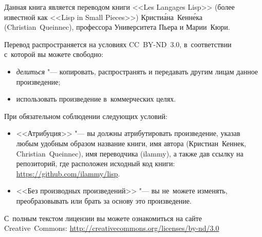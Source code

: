\begingroup
\thispagestyle{empty}
\setlength{\parindent}{0pt}
\small

Данная книга является переводом книги <<Les Langages Lisp>> (более известной
как <<Lisp in Small Pieces>>) Кристи\'{а}на~Кенн\'{е}ка (Christian~Queinnec),
профессора Университета Пьера и Марии~Кюри.

\bigskip

Перевод распространяется на условиях \textsf{CC~BY-ND~3.0}, в~соответствии
с~которой вы можете свободно:

\begin{itemize}
  \item \emph{делиться} "--- копировать, распространять и передавать другим
        лицам данное произведение;

  \item использовать произведение в~коммерческих целях.
\end{itemize}

\noindent
При обязательном соблюдении следующих условий:

\begin{itemize}
  \item <<Атрибуция>> "--- вы должны атрибутировать произведение, указав любым
        удобным образом название книги, имя автора (Кристиан~Кеннек,
        Christian~Queinnec), имя переводчика (ilammy), а также дав ссылку
        на репозиторий, где расположен исходный код книги:
        \url{https://github.com/ilammy/lisp}.

  \item <<Без производных произведений>> "--- вы не~можете изменять,
        преобразовывать или брать за основу это произведение.
\end{itemize}

С~полным текстом лицензии вы можете ознакомиться на сайте Creative~Commons:
\url{http://creativecommons.org/licenses/by-nd/3.0}

\vfill

\begin{center}\footnotesize
{}
\end{center}

\endgroup

\clearpage
